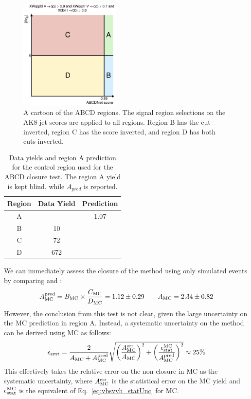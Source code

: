 \begin{figure}[htb]
    \centering
    \includegraphics[width=0.45\textwidth]{fig/vbsvvh/ABCD_abcdnet_score_gt_0p89_vs_abs_deta_jj_gt_5p0.pdf}
    \caption[A cartoon of the ABCD regions]{
        A cartoon of the ABCD regions. 
        The signal region selections on the AK8 jet \ParticleNet scores are applied to all regions. 
        Region B has the \detajj cut inverted, region C has the \ABCDNet score inverted, and region D has both cuts inverted. 
    }
    \label{fig:vbsvvh_abcd}
\end{figure}

\begin{table}[htbp]
    \centering
    \caption[VBS $\VVH$ ABCD yields]{
        Data yields and region A prediction for the control region used for the ABCD closure test. 
        The region A yield is kept blind, while $A_{pred}$ is reported.
    }
    \begin{tabular}{ccc}
    \toprule
    \textbf{Region} & Data Yield & Prediction \\
    \midrule
    A               & --         & 1.07       \\
    B               & 10         &            \\
    C               & 72         &            \\
    D               & 672        &            \\
    \bottomrule
    \end{tabular}
    \label{tab:0lepABCDregion}
\end{table}

We can immediately assess the closure of the method using only simulated events by comparing \AMCPred and \AMC:
\begin{equation*}
    A_{\mathrm{MC}}^{\text{pred}} = B_{\mathrm{MC}}\times\frac{C_{\mathrm{MC}}}{D_{\mathrm{MC}}} = 1.12\pm0.29 \qquad A_{\mathrm{MC}} = 2.34\pm0.82
\end{equation*}
However, the conclusion from this test is not clear, given the large uncertainty on the MC prediction in region A. 
Instead, a systematic uncertainty on the method \Esyst can be derived using MC as follows:
\begin{equation}
    \epsilon_{\text{syst}} = 
        \frac{2}{A_{\mathrm{MC}} + A_{\mathrm{MC}}^{\text{pred}}}
        \sqrt{\bigg(\frac{A_{\mathrm{MC}}^\text{err}}{A_{\mathrm{MC}}}\bigg)^2 + \bigg(\frac{\epsilon_{\text{stat}}^\mathrm{MC}}{A_{\mathrm{MC}}^{\text{pred}}}\bigg)^2} \approx 25\%
\end{equation}
This effectively takes the relative error on the non-closure in MC as the systematic uncertainty, where $A_{\mathrm{MC}}^\text{err}$ is the statistical error on the MC yield and $\epsilon_{\text{stat}}^\mathrm{MC}$ is the equivalent of Eq.~\ref{eq:vbsvvh_statUnc} for MC.

